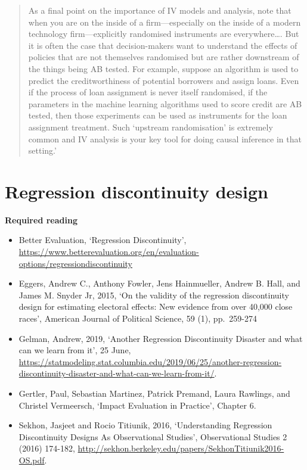 \documentclass[
]{book}
\providecommand{\tightlist}{%
  \setlength{\itemsep}{0pt}\setlength{\parskip}{0pt}}
\begin{document}
\begin{quote}
As a final point on the importance of IV models and analysis, note that when you are on the inside of a firm---especially on the inside of a modern technology firm---explicitly randomised instruments are everywhere\ldots. But it is often the case that decision-makers want to understand the effects of policies that are not themselves randomised but are rather downstream of the things being AB tested. For example, suppose an algorithm is used to predict the creditworthiness of potential borrowers and assign loans. Even if the process of loan assignment is never itself randomised, if the parameters in the machine learning algorithms used to score credit are AB tested, then those experiments can be used as instruments for the loan assignment treatment. Such `upstream randomisation' is extremely common and IV analysis is your key tool for doing causal inference in that setting.'
\end{quote}

\hypertarget{regression-discontinuity-design}{%
\chapter{Regression discontinuity design}\label{regression-discontinuity-design}}

\textbf{Required reading}

\begin{itemize}
\tightlist
\item
  Better Evaluation, `Regression Discontinuity', \url{https://www.betterevaluation.org/en/evaluation-options/regressiondiscontinuity}
\item
  Eggers, Andrew C., Anthony Fowler, Jens Hainmueller, Andrew B. Hall, and James M. Snyder Jr, 2015, `On the validity of the regression discontinuity design for estimating electoral effects: New evidence from over 40,000 close races', American Journal of Political Science, 59 (1), pp.~259-274
\item
  Gelman, Andrew, 2019, `Another Regression Discontinuity Disaster and what can we learn from it', 25 June, \url{https://statmodeling.stat.columbia.edu/2019/06/25/another-regression-discontinuity-disaster-and-what-can-we-learn-from-it/}.
\item
  Gertler, Paul, Sebastian Martinez, Patrick Premand, Laura Rawlings, and Christel Vermeersch, `Impact Evaluation in Practice', Chapter 6.
\item
  Sekhon, Jasjeet and Rocio Titiunik, 2016, `Understanding Regression Discontinuity Designs As Observational Studies', Observational Studies 2 (2016) 174-182, \url{http://sekhon.berkeley.edu/papers/SekhonTitiunik2016-OS.pdf}.
\end{itemize}
\end{document}
